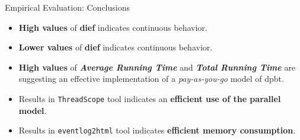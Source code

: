 \begin{frame}[fragile]{Empirical Evaluation: Conclusions}
  \begin{itemize}
    \setlength\itemsep{1.5em}
    \item \textbf{High values} of \textbf{dief\@t} indicates continuous behavior.
    \item \textbf{Lower values} of \textbf{dief\@k} indicates continuous behavior.
    \item \textbf{High values} of \textbf{\emph{Average Running Time}} and \textbf{\emph{Total Running Time}} are suggesting an effective implementation of a \emph{pay-as-you-go} model of \acrshort{dpbt}.
    \item Results in \texttt{ThreadScope} tool indicates an \textbf{efficient use of the parallel model}.
    \item Results in \texttt{eventlog2html} tool indicates \textbf{efficient memory consumption}.
  \end{itemize} 
\end{frame}
